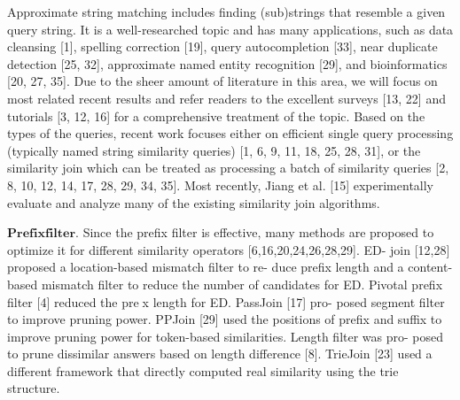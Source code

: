 Approximate string matching includes finding (sub)strings
that resemble a given query string. It is a well-researched
topic and has many applications, such as data cleansing [1],
spelling correction [19], query autocompletion [33], near duplicate
detection [25, 32], approximate named entity recognition
[29], and bioinformatics [20, 27, 35].
Due to the sheer amount of literature in this area, we will
focus on most related recent results and refer readers to the
excellent surveys [13, 22] and tutorials [3, 12, 16] for a comprehensive
treatment of the topic.
Based on the types of the queries, recent work focuses either
on efficient single query processing (typically named string
similarity queries) [1, 6, 9, 11, 18, 25, 28, 31], or the similarity
join which can be treated as processing a batch of similarity
queries [2, 8, 10, 12, 14, 17, 28, 29, 34, 35]. Most recently,
Jiang et al. [15] experimentally evaluate and analyze many of
the existing similarity join algorithms.


$\mathbf{Prefix filter.}$ Since the prefix
filter is effective, many methods are proposed to optimize it
for different similarity operators [6,16,20,24,26,28,29]. ED-
join [12,28] proposed a location-based mismatch filter to re-
duce prefix length and a content-based mismatch filter to
reduce the number of candidates for ED. Pivotal prefix filter [4] reduced the prex length for ED. PassJoin [17] pro-
posed segment filter to improve pruning power. PPJoin [29]
used the positions of prefix and suffix to improve pruning
power for token-based similarities. Length filter was pro-
posed to prune dissimilar answers based on length difference [8]. TrieJoin [23] used a different framework that directly computed real similarity using the trie structure.
